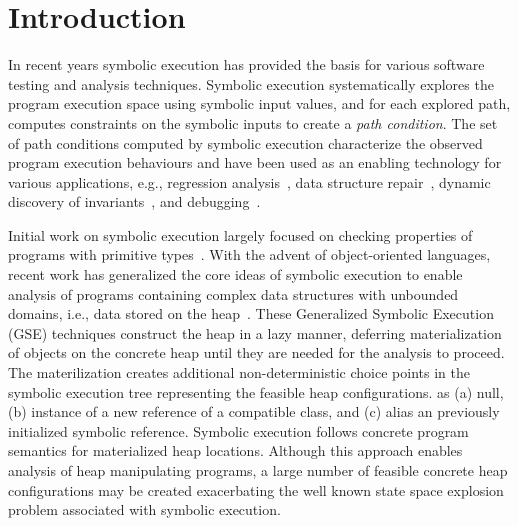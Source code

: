 \section{Introduction}

In recent years symbolic execution has provided the basis for various 
software testing and analysis techniques. Symbolic execution
systematically explores the program execution space using
symbolic input values, and for each explored path, computes
constraints on the symbolic inputs to create a \emph{ path condition}.
The set of path conditions computed by
symbolic execution characterize the observed program execution
behaviours and have been used as an enabling technology for various
applications, e.g., regression
analysis~\cite{backes:2012,Godefroid:SAS11,Person:FSE08,person:pldi2011,Ramos:2011,Yang:ISSTA12},
data structure repair~\cite{KhurshidETAL05RepairingStructurally},
dynamic discovery of
invariants~\cite{CsallnerETAL08DySy,Zhang:ISSTA14}, and
debugging~\cite{Ma:2011}.

Initial work on symbolic execution largely focused on checking 
properties of programs with primitive types~\cite{clarke76TSE,King:76}.
With the advent of object-oriented languages,
recent work has generalized the core ideas of symbolic execution to enable 
analysis of programs containing complex data structures with unbounded 
domains, i.e., data stored on the heap~\cite{Kiasan06,Kiasan07,GSE03}.  
These Generalized Symbolic Execution (GSE) techniques construct the 
heap in a lazy manner, deferring
materialization of objects on the concrete heap until they are needed
for the analysis to proceed. The materilization 
creates additional non-deterministic choice points in the symbolic
execution tree representing the feasible heap configurations.  as (a)
null, (b) instance of a new reference of a compatible class, and (c)
alias an previously initialized symbolic reference.  Symbolic
execution follows concrete program semantics for materialized heap
locations. Although this approach enables analysis of heap
manipulating programs, a large number of feasible concrete heap
configurations may be created exacerbating the well known state space
explosion problem associated with symbolic execution.

